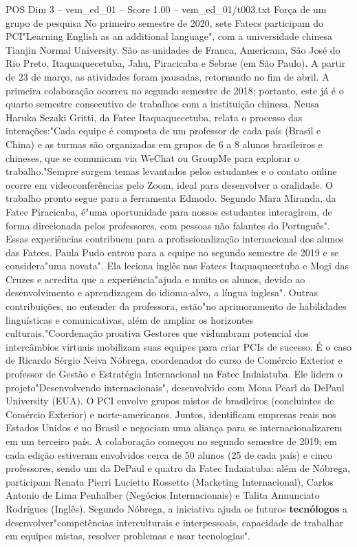 \begin{textsample}{POS Dim 3 – vem\_ed\_01 – Score 1.00 – vem\_ed\_01/t003.txt}  \label{ex:f3_pos_007}
Força de um grupo de pesquisa No primeiro semestre de 2020, sete Fatecs participam do PCI"Learning English as an additional language", com a universidade chinesa Tianjin Normal University.
São as unidades de Franca, Americana, São José do Rio Preto, Itaquaquecetuba, Jahu, Piracicaba e Sebrae (em São Paulo).
A partir de 23 de março, as atividades foram pausadas, retornando no fim de abril.
A primeira colaboração ocorreu no segundo semestre de 2018; portanto, este já é o quarto semestre consecutivo de trabalhos com a instituição chinesa.
Neusa Haruka Sezaki Gritti, da Fatec Itaquaquecetuba, relata o processo das interações:"Cada equipe é composta de um professor de cada país (Brasil e China) e as turmas são organizadas em grupos de 6 a 8 alunos brasileiros e chineses, que se comunicam via WeChat ou GroupMe para explorar o trabalho."Sempre surgem temas levantados pelos estudantes e o contato online ocorre em videoconferências pelo Zoom, ideal para desenvolver a oralidade.
O trabalho pronto segue para a ferramenta Edmodo.
Segundo Mara Miranda, da Fatec Piracicaba, é"uma oportunidade para nossos estudantes interagirem, de forma direcionada pelos professores, com pessoas não falantes do Português".
Essas experiências contribuem para a profissionalização internacional dos alunos das Fatecs.
Paula Pudo entrou para a equipe no segundo semestre de 2019 e se considera"uma novata".
Ela leciona inglês nas Fatecs Itaquaquecetuba e Mogi das Cruzes e acredita que a experiência"ajuda e muito os alunos, devido ao desenvolvimento e aprendizagem do idioma-alvo, a língua inglesa".
Outras contribuições, no entender da professora, estão"no aprimoramento de habilidades linguísticas e comunicativas, além de ampliar os horizontes culturais."Coordenação proativa Gestores que vislumbram potencial dos intercâmbios virtuais mobilizam suas equipes para criar PCIs de sucesso.
É o caso de Ricardo Sérgio Neiva Nóbrega, coordenador do curso de Comércio Exterior e professor de Gestão e Estratégia Internacional na Fatec Indaiatuba.
Ele lidera o projeto"Desenvolvendo internacionais", desenvolvido com Mona Pearl da DePaul University (EUA).
O PCI envolve grupos mistos de brasileiros (concluintes de Comércio Exterior) e norte-americanos.
Juntos, identificam empresas reais nos Estados Unidos e no Brasil e negociam uma aliança para se internacionalizarem em um terceiro país.
A colaboração começou no segundo semestre de 2019; em cada edição estiveram envolvidos cerca de 50 alunos (25 de cada país) e cinco professores, sendo um da DePaul e quatro da Fatec Indaiatuba: além de Nóbrega, participam Renata Pierri Lucietto Rossetto (Marketing Internacional), Carlos Antonio de Lima Penhalber (Negócios Internacionais) e Talita Annunciato Rodrigues (Inglês).
Segundo Nóbrega, a iniciativa ajuda os futuros \textbf{tecnólogos} a desenvolver"competências interculturais e interpessoais, capacidade de trabalhar em equipes mistas, resolver problemas e usar tecnologias".

\end{textsample}
